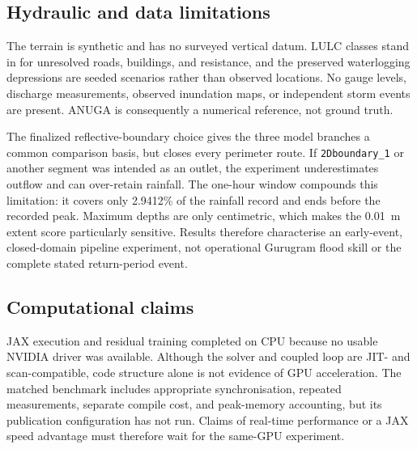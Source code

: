 \subsection{Hydraulic and data limitations}

The terrain is synthetic and has no surveyed vertical datum.  LULC classes
stand in for unresolved roads, buildings, and resistance, and the preserved
waterlogging depressions are seeded scenarios rather than observed locations.
No gauge levels, discharge measurements, observed inundation maps, or
independent storm events are present.  ANUGA is consequently a numerical
reference, not ground truth.

The finalized reflective-boundary choice gives the three model branches a
common comparison basis, but closes every perimeter route.  If
\texttt{2Dboundary\_1} or another segment was intended as an outlet, the
experiment underestimates outflow and can over-retain rainfall.  The one-hour
window compounds this limitation: it covers only 2.9412\% of the rainfall
record and ends before the recorded peak.  Maximum depths are only centimetric,
which makes the 0.01~m extent score particularly sensitive.  Results therefore
characterise an early-event, closed-domain pipeline experiment, not
operational Gurugram flood skill or the complete stated return-period event.

\subsection{Computational claims}

JAX execution and residual training completed on CPU because no usable NVIDIA
driver was available.  Although the solver and coupled loop are JIT- and
scan-compatible, code structure alone is not evidence of GPU acceleration.
The matched benchmark includes appropriate synchronisation, repeated
measurements, separate compile cost, and peak-memory accounting, but its
publication configuration has not run.  Claims of real-time performance or a
JAX speed advantage must therefore wait for the same-GPU experiment.
